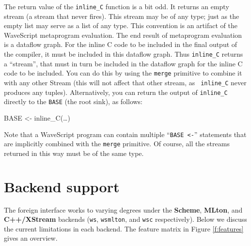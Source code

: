 The return value of the {\tt inline\_C} function is a bit odd.  It
returns an empty stream (a stream that never fires).  This stream may
be of any type; just as the empty list may serve as a list of any
type.  This convention is an artifact of the WaveScript metaprogram
evaluation.  The end result of metaprogram evaluation is a dataflow
graph.  For the inline C code to be included in the final output of
the compiler, it must be included in this dataflow graph.  Thus {\tt inline\_C}
returns a ``stream'', that must in turn be included in the dataflow
graph for the inline C code to be included.
%
You can do this by using the {\tt merge} primitive to combine it with any
other Stream (this will not affect that other stream, as {\tt
inline\_C} never produces any tuples).  Alternatively, you can return the
output of {\tt inline\_C} directly to the {\tt BASE} (the root sink),
as follows:

\begin{wscode}
BASE <- inline\_C(\dots)
\end{wscode}

Note that a WaveScript program can contain multiple ``{\tt BASE <-}''
statements that are implicitly combined with the {\tt merge}
primitive.  Of course, all the streams returned in this way must be of
the same type.
%




\section{Backend support}

The foreign interface works to varying degrees under the {\bf Scheme},
 {\bf MLton}, and {\bf C++/XStream} backends ({\tt ws}, {\tt wsmlton},
 and {\tt wsc} respectively).  Below we discuss the current  limitations in each
 backend.  The feature matrix in Figure \ref{f:features} gives an
 overview.

